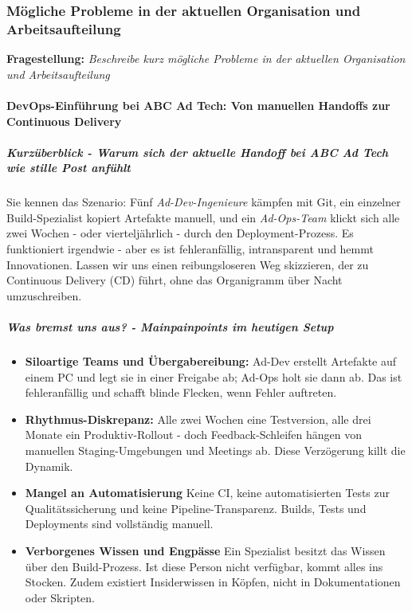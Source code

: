 \subsubsection{Mögliche Probleme in der aktuellen Organisation und Arbeitsaufteilung}

\textbf{Fragestellung:} \textit{Beschreibe kurz mögliche Probleme in der aktuellen Organisation und Arbeitsaufteilung}

\paragraph{DevOps-Einführung bei ABC Ad Tech: Von manuellen Handoffs zur Continuous Delivery}
\subparagraph{Kurzüberblick - Warum sich der aktuelle Handoff bei ABC Ad Tech wie stille Post anfühlt}
Sie kennen das Szenario: Fünf \textit{Ad-Dev-Ingenieure} kämpfen mit Git, ein einzelner Build-Spezialist kopiert Artefakte manuell,
und ein \textit{Ad-Ops-Team} klickt sich alle zwei Wochen - oder vierteljährlich - durch den Deployment-Prozess. Es funktioniert irgendwie - aber es ist fehleranfällig, intransparent und hemmt Innovationen. 
Lassen wir uns einen reibungsloseren Weg skizzieren, der zu Continuous Delivery (CD) führt, ohne das Organigramm über Nacht umzuschreiben.    
\subparagraph{Was bremst uns aus? - Mainpainpoints im heutigen Setup}
\begin{itemize}
    \item \textbf{Siloartige Teams und Übergabereibung:} Ad-Dev erstellt Artefakte auf einem PC und legt sie in einer Freigabe ab; Ad-Ops holt sie dann ab. Das ist fehleranfällig und schafft blinde Flecken, wenn Fehler auftreten.
    \item \textbf{Rhythmus-Diskrepanz:} Alle zwei Wochen eine Testversion, alle drei Monate ein Produktiv-Rollout - doch Feedback-Schleifen hängen von manuellen Staging-Umgebungen und Meetings ab. 
    Diese Verzögerung killt die Dynamik.
    \item \textbf{Mangel an Automatisierung} Keine CI, keine automatisierten Tests zur Qualitätssicherung und keine Pipeline-Transparenz. Builds, Tests und Deployments sind vollständig manuell.
    \item \textbf{Verborgenes Wissen und Engpässe} Ein Spezialist besitzt das Wissen über den Build-Prozess. Ist diese Person nicht verfügbar, kommt alles ins Stocken. Zudem existiert Insiderwissen in Köpfen, nicht in Dokumentationen oder Skripten.
\end{itemize}


